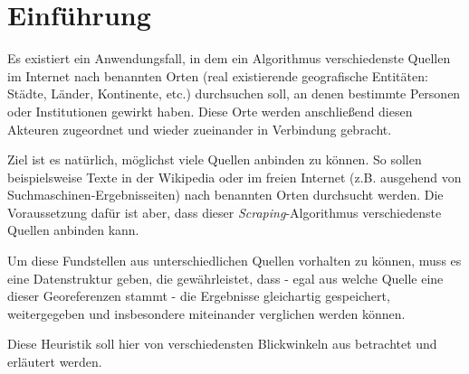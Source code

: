 \section{Einführung}
\label{introduction}
Es existiert ein Anwendungsfall, in dem ein Algorithmus verschiedenste Quellen im Internet nach benannten Orten (real existierende geografische Entitäten: Städte, Länder, Kontinente, etc.) durchsuchen soll, an denen bestimmte Personen oder Institutionen gewirkt haben. Diese Orte werden anschließend diesen Akteuren zugeordnet und wieder zueinander in Verbindung gebracht.

Ziel ist es natürlich, möglichst viele Quellen anbinden zu können. So sollen beispielsweise Texte in der Wikipedia oder im freien Internet (z.B. ausgehend von Suchmaschinen-Ergebnisseiten) nach benannten Orten durchsucht werden. Die Voraussetzung dafür ist aber, dass dieser \textit{Scraping}-Algorithmus verschiedenste Quellen anbinden kann.

Um diese Fundstellen aus unterschiedlichen Quellen vorhalten zu können, muss es eine Datenstruktur geben, die gewährleistet, dass - egal aus welche Quelle eine dieser Georeferenzen stammt - die Ergebnisse gleichartig gespeichert, weitergegeben und insbesondere miteinander verglichen werden können.

Diese Heuristik soll hier von verschiedensten Blickwinkeln aus betrachtet und erläutert werden.
